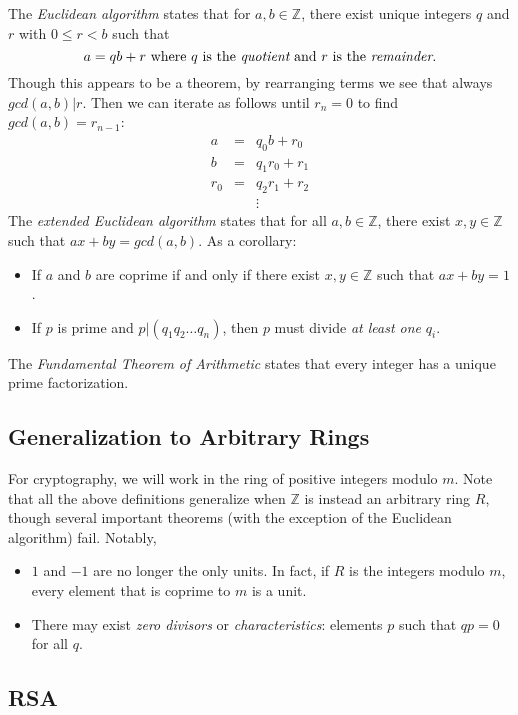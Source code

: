 \documentclass[12pt]{article}
\begin{document}
The {\it Euclidean algorithm} states that for $a,b \in\mathbb{Z}$,
there exist unique integers $q$ and $r$ with $0\leq r < b$ such that
$$
a = qb + r 
\text{ where $q$ is the {\it quotient} and $r$ is the {\it remainder}.}
$$
Though this appears to be a theorem, by rearranging terms we see that always
$gcd(a,b) | r$.
Then we can iterate as follows until $r_n = 0$ to find $gcd(a,b) = r_{n-1}$:
$$
\begin{array}{rcl}
a &=& q_0 b + r_0\\
b &=& q_1 r_0 + r_1\\
r_0 &=& q_2 r_1 + r_2\\
&&\vdots
\end{array}
$$
The {\it extended Euclidean algorithm} states
that for all $a,b \in\mathbb{Z}$, there exist $x,y\in\mathbb{Z}$ such that
$ax + by = gcd(a,b)$.
As a corollary:
\begin{itemize}
\item If $a$ and $b$ are coprime if and only
if there exist $x,y\in\mathbb{Z}$ such that $ax + by = 1$.
\item If $p$ is prime and $p | (q_1 q_2 \ldots q_n)$, then $p$ must
divide {\it at least one} $q_i$.
\end{itemize}

The {\it Fundamental Theorem of Arithmetic} states that every integer
has a unique prime factorization.

\subsection*{Generalization to Arbitrary Rings}

For cryptography, we will work in the ring of positive integers modulo
$m$.
Note that all the above definitions generalize when $\mathbb{Z}$
is instead an arbitrary ring $R$, though several important theorems
(with the exception of the Euclidean algorithm) fail.
Notably,
\begin{itemize}
\item $1$ and $-1$ are no longer the only units. In fact, if $R$ is the
integers modulo $m$, every element that is coprime to $m$ is a unit.
\item There may exist {\it zero divisors} or {\it characteristics}: 
elements $p$ such that $qp = 0$ for all $q$.
\end{itemize}

\subsection*{RSA}
\end{document}
